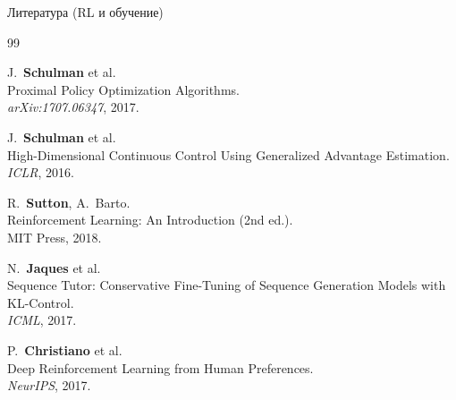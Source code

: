 \begin{frame}{Литература (RL и обучение)}

\footnotesize
\begin{thebibliography}{99}

  J.~\textbf{Schulman} et al.\\
  Proximal Policy Optimization Algorithms.\\
  \emph{arXiv:1707.06347}, 2017.

  J.~\textbf{Schulman} et al.\\
  High-Dimensional Continuous Control Using Generalized Advantage
  Estimation.\\
  \emph{ICLR}, 2016.

  R.~\textbf{Sutton}, A.~Barto.\\
  Reinforcement Learning: An Introduction (2nd ed.).\\
  MIT Press, 2018.

  N.~\textbf{Jaques} et al.\\
  Sequence Tutor: Conservative Fine-Tuning of Sequence Generation
  Models with KL-Control.\\
  \emph{ICML}, 2017.

  P.~\textbf{Christiano} et al.\\
  Deep Reinforcement Learning from Human Preferences.\\
  \emph{NeurIPS}, 2017.

\end{thebibliography}

\end{frame}

